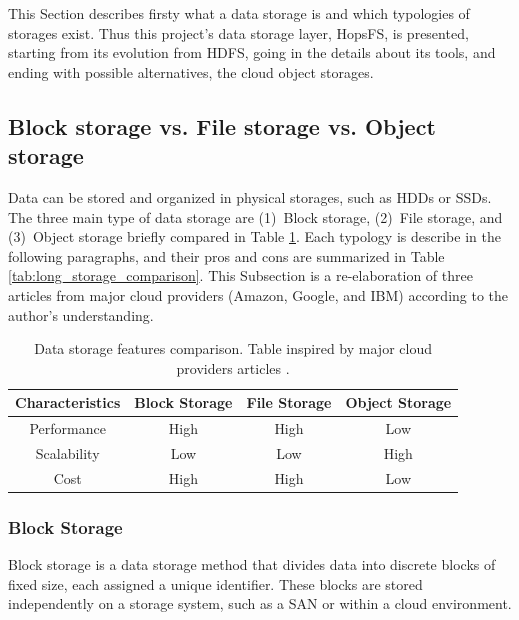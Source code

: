 This Section describes firsty what a data storage is and which typologies of storages exist. Thus this project's data storage layer, \gls{HopsFS}, is presented, starting from its evolution from \gls{HDFS}, going in the details about its tools, and ending with possible alternatives, the cloud object storages.

\subsection{Block storage vs. File storage vs. Object storage}
\label{subsec:block_vs_file_vs_object}

Data can be stored and organized in physical storages, such as \glspl{HDD} or \glspl{SSD}. The three main type of data storage are (1)~Block storage, (2)~File storage, and (3)~Object storage briefly compared in Table \ref{tab:short_storage_comparison}. Each typology is describe in the following paragraphs, and their pros and cons are summarized in Table \ref{tab:long_storage_comparison}. This Subsection is a re-elaboration of three articles from major cloud providers (Amazon, Google, and IBM) \cite{BlockVsFile, HowObjectVs, ObjectVsFile2021} according to the author's understanding.

\begin{table}[!ht]
    \begin{center}
      \caption[Data storage features comparison]{Data storage features comparison. Table inspired by major cloud providers articles \cite{BlockVsFile,HowObjectVs,ObjectVsFile2021}.}
      \label{tab:short_storage_comparison}
      \begin{tabular}{cccc}
        \toprule
        \textbf{Characteristics} & \textbf{Block Storage} & \textbf{File Storage} & \textbf{Object Storage}\\
        \midrule
        Performance & High & High & Low\\
        Scalability & Low & Low & High\\
        Cost & High & High & Low\\
        \bottomrule
      \end{tabular}
    \end{center}
\end{table}

\subsubsection*{Block Storage}

Block storage is a data storage method that divides data into discrete blocks of fixed size, each assigned a unique identifier. These blocks are stored independently on a storage system, such as a \gls{SAN} or within a cloud environment. 

